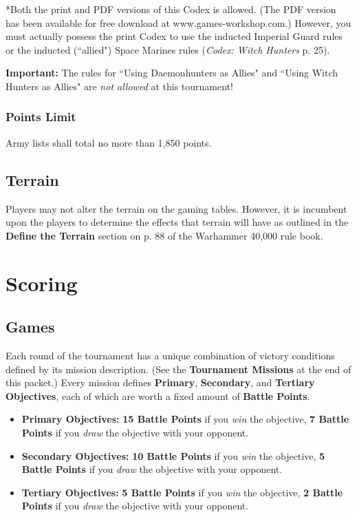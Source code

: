 \documentclass[12pt,titlepage]{article}
\begin{document}
*Both the print and PDF versions of this Codex is allowed. (The PDF version has been available for free download at www.games-workshop.com.) However, you must actually possess the print Codex to use the inducted Imperial Guard rules or the inducted (``allied") Space Marines rules (\textit{Codex: Witch Hunters} p. 25).

\textbf{Important:} The rules for ``Using Daemonhunters as Allies" and ``Using Witch Hunters as Allies" are \textit{not allowed} at this tournament!

\subsubsection*{Points Limit}

Army lists shall total no more than 1,850 points.

\subsection*{Terrain}

Players may not alter the terrain on the gaming tables. However, it is incumbent upon the players to determine the effects that terrain will have as outlined in the \textbf{Define the Terrain} section on p. 88 of the Warhammer 40,000 rule book.

\section*{Scoring}

\subsection*{Games}

Each round of the tournament has a unique combination of victory conditions defined by its mission description. (See the \textbf{Tournament Missions} at the end of this packet.) Every mission defines \textbf{Primary}, \textbf{Secondary}, and \textbf{Tertiary Objectives}, each of which are worth a fixed amount of \textbf{Battle Points}.

\begin{itemize}
\item \textbf{Primary Objectives:} \textbf{15 Battle Points} if you \textit{win} the objective, \textbf{7 Battle Points} if you \textit{draw} the objective with your opponent.
\item \textbf{Secondary Objectives:} \textbf{10 Battle Points} if you \textit{win} the objective, \textbf{5 Battle Points} if you \textit{draw} the objective with your opponent.
\item \textbf{Tertiary Objectives:} \textbf{5 Battle Points} if you \textit{win} the objective, \textbf{2 Battle Points} if you \textit{draw} the objective with your opponent.
\end{itemize}
\end{document}

